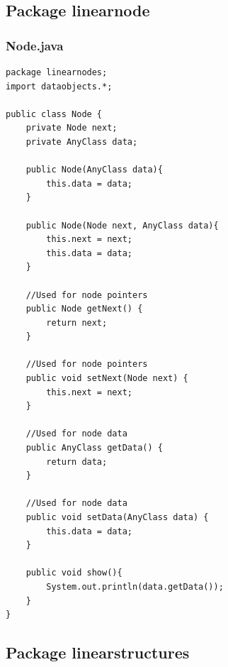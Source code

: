 \documentclass[12pt]{article}
\begin{document}
\newpage
\subsection{Package linearnode}

\subsubsection{Node.java}
\begin{lstlisting}
package linearnodes;
import dataobjects.*;

public class Node {
    private Node next;
    private AnyClass data;

    public Node(AnyClass data){
        this.data = data;
    }

    public Node(Node next, AnyClass data){
        this.next = next;
        this.data = data;
    }

    //Used for node pointers
    public Node getNext() {
        return next;
    }

    //Used for node pointers
    public void setNext(Node next) {
        this.next = next;
    }

    //Used for node data
    public AnyClass getData() {
        return data;
    }

    //Used for node data
    public void setData(AnyClass data) {
        this.data = data;
    }

    public void show(){
        System.out.println(data.getData());
    }
}

\end{lstlisting}
\newpage
\subsection{Package linearstructures}
\end{document}
